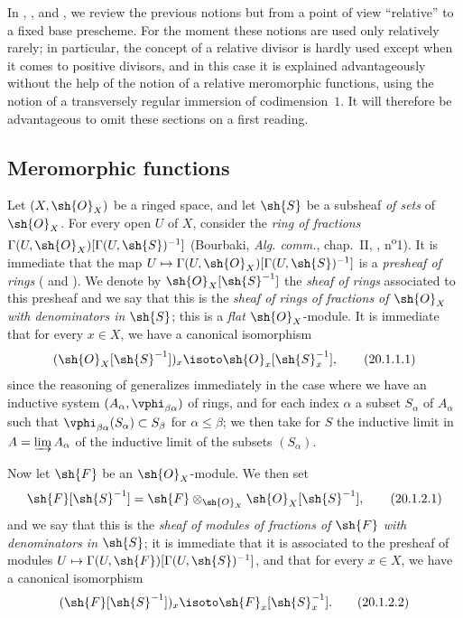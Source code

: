 In , , and , we review the previous notions but from a point of view ``relative'' to a fixed base prescheme.
For the moment these notions are used only relatively rarely; in particular, the concept of a relative divisor is hardly used except when it comes to positive divisors, and in this case it is explained advantageously without the help of the notion of a relative meromorphic functions, using the notion of a transversely regular immersion of codimension~$1$.
It will therefore be advantageous to omit these sections on a first reading.

\subsection{Meromorphic functions}
\label{IV.20.1}

\begin{env}[20.1.1]
\label{IV.20.1.1}
Let $(X,\sh{O}_X)$ be a ringed space, and let $\sh{S}$ be a subsheaf \emph{of sets} of $\sh{O}_X$.
For every open $U$ of $X$, consider the \emph{ring of fractions} $\Gamma(U,\sh{O}_X)[\Gamma(U,\sh{S})^{-1}]$ (Bourbaki, \emph{Alg. comm.}, chap.~II, , n\textsuperscript{o}1).
It is immediate that the map $U\mapsto\Gamma(U,\sh{O}_X)[\Gamma(U,\sh{S})^{-1}]$ is a \emph{presheaf of rings} ( and ).
We denote by $\sh{O}_X[\sh{S}^{-1}]$ the \emph{sheaf of rings} associated to this presheaf and we say that this is the \emph{sheaf of rings of fractions of $\sh{O}_X$ with denominators in $\sh{S}$};
this is a \emph{flat} $\sh{O}_X$-module.
It is immediate that for every $x\in X$, we have a canonical isomorphism
\[
\label{IV.20.1.1.1}
  (\sh{O}_X[\sh{S}^{-1}])_x\isoto\sh{O}_x[\sh{S}_x^{-1}],
  \tag{20.1.1.1}
\]
since the reasoning of  generalizes immediately in the case where we have an inductive system $(A_\alpha,\vphi_{\beta\alpha})$ of rings, and for each index $\alpha$ a subset $S_\alpha$ of $A_\alpha$ such that
$\vphi_{\beta\alpha}(S_\alpha)\subset S_\beta$ for $\alpha\leq\beta$;
we then take for $S$ the inductive limit in $A=\varinjlim A_\alpha$ of the inductive limit of the subsets $(S_\alpha)$.
\end{env}

\begin{env}[20.1.2]
Now let $\sh{F}$ be an $\sh{O}_X$-module.
We then set
\[
\label{IV.20.1.2.1}
  \sh{F}[\sh{S}^{-1}]=\sh{F}\otimes_{\sh{O}_X}\sh{O}_X[\sh{S}^{-1}],
  \tag{20.1.2.1}
\]
and we say that this is the \emph{sheaf of modules of fractions of $\sh{F}$ with denominators in $\sh{S}$};
it is immediate that it is associated to the presheaf of modules $U\mapsto\Gamma(U,\sh{F})[\Gamma(U,\sh{S})^{-1}]$, and that for every $x\in X$, we have a canonical isomorphism
\[
\label{IV.20.1.2.2}
  (\sh{F}[\sh{S}^{-1}])_x\isoto\sh{F}_x[\sh{S}_x^{-1}].
  \tag{20.1.2.2}
\]
\end{env}

